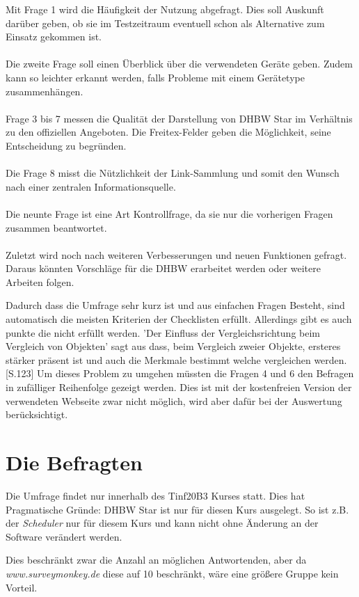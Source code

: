 Mit Frage 1 wird die Häufigkeit der Nutzung abgefragt. Dies soll Auskunft darüber geben, ob sie im Testzeitraum eventuell schon als Alternative zum Einsatz gekommen ist.
\\\\
Die zweite Frage soll einen Überblick über die verwendeten Geräte geben. Zudem kann so leichter erkannt werden, falls Probleme mit einem Gerätetype zusammenhängen.
\\\\
Frage 3 bis 7 messen die Qualität der Darstellung von DHBW Star im Verhältnis zu den offiziellen Angeboten. Die Freitex-Felder geben die Möglichkeit, seine Entscheidung zu begründen.
\\\\
Die Frage 8 misst die Nützlichkeit der Link-Sammlung und somit den Wunsch nach einer zentralen Informationsquelle.
\\\\
Die neunte Frage ist eine Art Kontrollfrage, da sie nur die vorherigen Fragen zusammen beantwortet.
\\\\
Zuletzt wird noch nach weiteren Verbesserungen und neuen Funktionen gefragt. Daraus könnten Vorschläge für die DHBW erarbeitet werden oder weitere Arbeiten folgen.

Dadurch dass die Umfrage sehr kurz ist und aus einfachen Fragen Besteht, sind automatisch die meisten Kriterien der Checklisten erfüllt. Allerdings gibt es auch punkte die nicht erfüllt werden. 'Der Einfluss der Vergleichsrichtung beim Vergleich von Objekten' sagt aus dass, beim Vergleich zweier Objekte, ersteres stärker präsent ist und auch die Merkmale bestimmt welche vergleichen werden. \cite{fragebogenRolf} [S.123]
Um dieses Problem zu umgehen müssten die Fragen 4 und 6 den Befragen in zufälliger Reihenfolge gezeigt werden. Dies ist mit der kostenfreien Version der verwendeten Webseite zwar nicht möglich,
wird aber dafür bei der Auswertung berücksichtigt.

\section{Die Befragten}
Die Umfrage findet nur innerhalb des Tinf20B3 Kurses statt. Dies hat Pragmatische Gründe: DHBW Star ist nur für diesen Kurs ausgelegt. So ist z.B. der \emph{Scheduler} nur für diesem Kurs und kann nicht ohne Änderung an der Software verändert werden.

Dies beschränkt zwar die Anzahl an möglichen Antwortenden, aber da \emph{www.surveymonkey.de} diese auf 10 beschränkt, wäre eine größere Gruppe kein Vorteil.